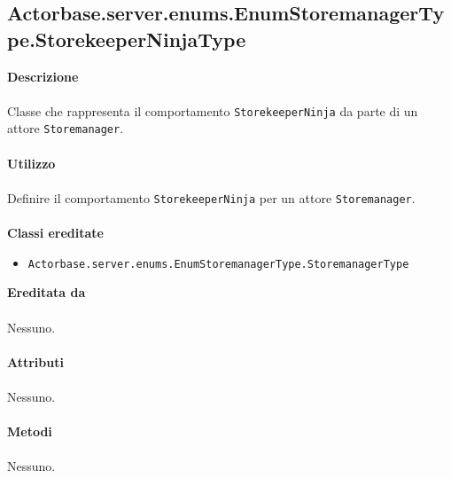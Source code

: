 \documentclass[a4paper]{article}
\begin{document}
			\subsection{Actorbase.server.enums.EnumStoremanagerType.StorekeeperNinjaType}
		\textbf{Descrizione}
			\\ \\
			Classe che rappresenta il comportamento \texttt{StorekeeperNinja} da parte di un attore \texttt{Storemanager}.
			\\ \\
		\textbf{Utilizzo}
			\\ \\
			Definire il comportamento \texttt{StorekeeperNinja} per un attore \texttt{Storemanager}.
			\\ \\
		\textbf{Classi ereditate}
			\begin{itemize}
				\item \texttt{Actorbase.server.enums.EnumStoremanagerType.StoremanagerType}
			\end{itemize}
		\textbf{Ereditata da}
		\\ \\
		Nessuno.
		\\ \\
		\textbf{Attributi}
		\\ \\
			Nessuno.
		\\ \\
		\textbf{Metodi}
			\\ \\
			Nessuno.
			
\end{document}
